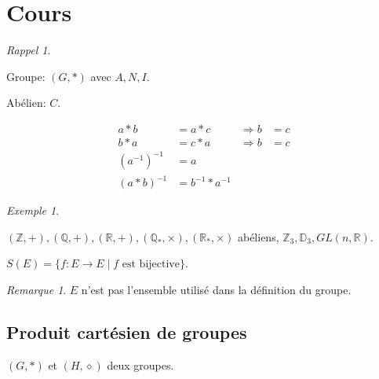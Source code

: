 \documentclass{report}
\newcounter{cours}
\newcommand*{\cours}{\section*{Cours \thecours}\stepcounter{cours}}
\newcommand*{\reels}{\mathbb{R}}
\newcommand*{\entiers}{\mathbb{Z}}
\newcommand*{\rationels}{\mathbb{Q}}
\theoremstyle{definition}
\theoremstyle{remark}
\newtheorem*{exem}{Exemple}
\newtheorem*{rema}{Remarque}
\newtheorem*{rappel}{Rappel}
\begin{document}
	\cours
	\begin{rappel}~

		\begin{ulist}[noitemsep]
			\item Groupe: $(G, *)$ avec $A, N, I$.

			Ab\'elien: $C$.
			\item
			\begin{align*}
				a*b&=a*c&\Rightarrow b&=c\\
				b*a&=c*a&\Rightarrow b&=c\\
				(a^{-1})^{-1}&= a\\
				(a*b)^{-1}&= b^{-1}*a^{-1}
			\end{align*}
			\item
			\begin{exem}~

				$(\entiers, +), (\rationels, +), (\reels, +), (\rationels_*, \times), (\reels_*, \times)$ ab\'eliens, $\entiers_3, \mathbb{D}_3, GL(n, \reels)$.

				$S(E)=\{f:E \to E \mid f\text{ est bijective}\}$.
				\begin{rema}
					$E$ n'est pas l'ensemble utilis\'e dans la d\'efinition du groupe.
				\end{rema}
			\end{exem}
		\end{ulist}
	\end{rappel}
	\subsection{Produit cart\'esien de groupes}
	$(G, *)$ et $(H, \diamond)$ deux groupes.
\end{document}
